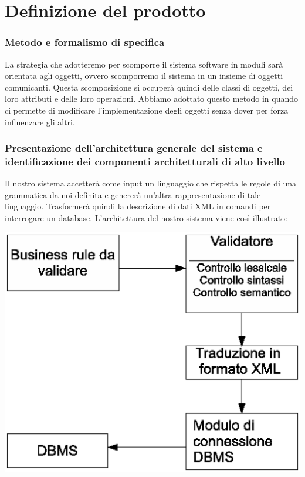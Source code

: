 \documentclass[11pt,titlepage,a4paper]{report}
\begin{document}
\chapter{Definizione del prodotto}
\subsection{Metodo e formalismo di specifica}
La strategia che adotteremo per scomporre il sistema software in moduli sar\`a orientata agli oggetti, ovvero scomporremo il sistema in un insieme di oggetti comunicanti. Questa scomposizione si occuper\`a quindi delle classi di oggetti, dei loro attributi e delle loro operazioni. Abbiamo adottato questo metodo in quando ci permette di modificare l'implementazione degli oggetti senza dover per forza influenzare gli altri.
\subsection{Presentazione dell'architettura generale del sistema e identificazione dei componenti architetturali di alto livello}
Il nostro sistema accetter\`a come input un linguaggio che rispetta le regole di una grammatica da noi definita e generer\`a un'altra rappresentazione di tale linguaggio. Trasformer\`a quindi la descrizione di dati XML in comandi per interrogare un database. L'architettura del nostro sistema viene cos\`i illustrato:
\begin{center}
\includegraphics[width=1\textwidth]{st.eps}
\end{center}
\end{document}
